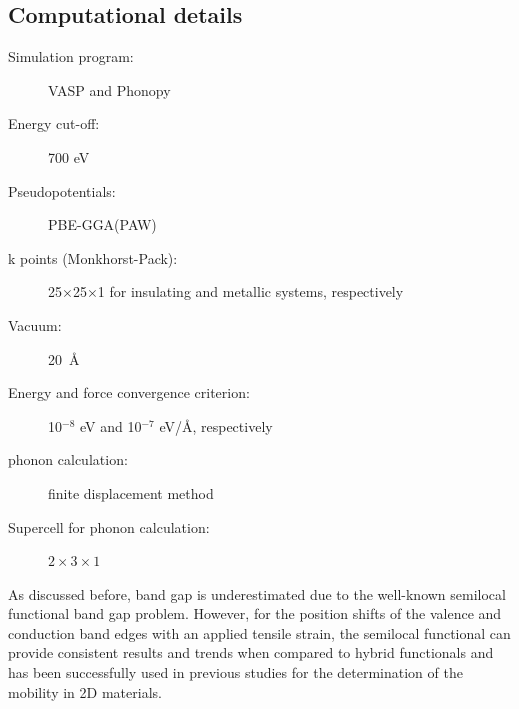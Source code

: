 \subsection{Computational details}

\begin{footnotesize}
\begin{description}
\item[Simulation program:] VASP and Phonopy
\item[Energy cut-off:] 700 eV
\item[Pseudopotentials:] PBE-GGA(PAW)
\item[k points (Monkhorst-Pack):] 25$\times$25$\times$1 for insulating and metallic systems, respectively 
\item[Vacuum:] 20~\AA
\item[Energy and force convergence criterion:] 10$^{-8}$ eV and 10$^{-7}$ eV/\AA, respectively
\item[phonon calculation:] finite displacement method
\item[Supercell for phonon calculation:] $2\times3\times1$
\end{description}
\end{footnotesize}
\vspace{0.5cm}
As discussed before, band gap is underestimated due to the well-known semilocal functional band gap problem. However, for the position shifts of the valence and conduction band edges with an applied tensile strain, the semilocal functional can provide consistent results and trends when compared to hybrid functionals and has  been successfully used in  previous studies for the determination of the mobility in 2D materials\cite{Meng-Qiu2009,Yongqing2014,fei}. 

